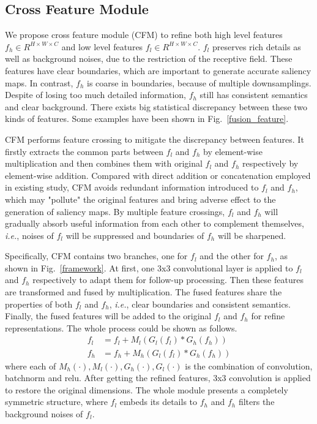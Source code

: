 \documentclass[letterpaper]{article} %
\begin{document}
\subsection{Cross Feature Module}
We propose cross feature module (CFM) to refine both high level features $f_h \in R^{H \times W \times C}$ and low level features $f_l \in R^{H \times W \times C}$. $f_l$ preserves rich details as well as background noises, due to the restriction of the receptive field. These features have clear boundaries, which are important to generate accurate saliency maps. In contrast, $f_h$ is coarse in boundaries, because of multiple downsamplings. Despite of losing too much detailed information, $f_h$ still has consistent semantics and clear background. There exists big statistical discrepancy between these two kinds of features. Some examples have been shown in Fig.~\ref{fusion_feature}. 

CFM performs feature crossing to mitigate the discrepancy between features. It firstly extracts the common parts between $f_l$ and $f_h$ by element-wise multiplication and then combines them with original $f_l$ and $f_h$ respectively by element-wise addition. Compared with direct addition or concatenation employed in existing study, CFM avoids redundant information introduced to $f_l$ and $f_h$, which may "pollute" the original features and bring adverse effect to the generation of saliency maps. By multiple feature crossings, $f_l$ and $f_h$ will gradually absorb useful information from each other to complement themselves, {\it i.e.}, noises of $f_l$ will be suppressed and boundaries of $f_h$ will be sharpened.

Specifically, CFM contains two branches, one for $f_l$ and the other for $f_h$, as shown in Fig.~\ref{framework}. At first, one 3x3 convolutional layer is applied to $f_l$ and $f_h$ respectively to adapt them for follow-up processing. Then these features are transformed and fused by multiplication. The fused features share the properties of both $f_l$ and $f_h$, {\it i.e.}, clear boundaries and consistent semantics. Finally, the fused features will be added to the original $f_l$ and $f_h$ for refine representations. The whole process could be shown as follows.
\begin{align}
  \label{CFM}
  f_l &= f_l + M_l(G_l(f_l)*G_h(f_h)) \\
  f_h &= f_h + M_h(G_l(f_l)*G_h(f_h))
\end{align}
where each of $M_h(\cdot), M_l(\cdot), G_h(\cdot), G_l(\cdot)$ is the combination of convolution, batchnorm and relu. After getting the refined features, 3x3 convolution is applied to restore the original dimensions. The whole module presents a completely symmetric structure, where $f_l$ embeds its details to $f_h$ and $f_h$ filters the background noises of $f_l$.
\end{document}
